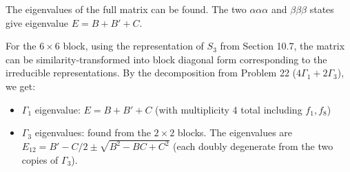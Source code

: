 \documentclass[12pt]{article}
\begin{document}
The eigenvalues of the full matrix can be found. The two $\alpha\alpha\alpha$ and $\beta\beta\beta$ states give eigenvalue $E = B + B' + C$.

For the $6\times 6$ block, using the representation of $S_3$ from Section 10.7, the matrix can be similarity-transformed into block diagonal form corresponding to the irreducible representations. By the decomposition from Problem 22 ($4\Gamma_1 + 2\Gamma_3$), we get:
\begin{itemize}
\item $\Gamma_1$ eigenvalue: $E = B + B' + C$ (with multiplicity 4 total including $f_1, f_8$)
\item $\Gamma_3$ eigenvalues: found from the $2\times 2$ blocks. The eigenvalues are $E_{12} = B' - C/2 \pm \sqrt{B^2 - BC + C^2}$ (each doubly degenerate from the two copies of $\Gamma_3$).
\end{itemize}
\end{document}
